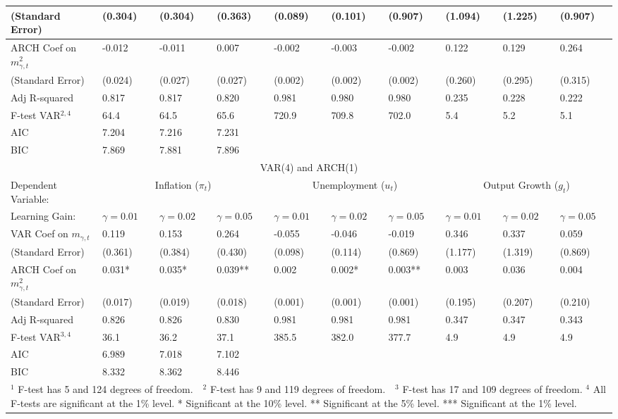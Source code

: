 \documentclass[12pt]{article}
\begin{document}
\begin{sidewaystable}
\begin{small}
\begin{center}
\begin{tabular}{l|p{0.64in} p{0.64in} p{0.64in}|p{0.64in} p{0.64in} p{0.64in}|p{0.64in} p{0.64in} p{0.64in}}
(Standard Error) & (0.304) & (0.304) & (0.363) & (0.089) & (0.101) & (0.907) & (1.094) & (1.225) & (0.907) \\ \hline
ARCH Coef on $m_{\gamma,t}^2$ & -0.012 & -0.011 & 0.007 & -0.002 & -0.003 & -0.002 & 0.122 & 0.129 & 0.264 \\
(Standard Error) & (0.024) & (0.027) & (0.027) & (0.002) & (0.002) & (0.002) & (0.260) & (0.295) & (0.315) \\ \hline
Adj R-squared & 0.817 & 0.817 & 0.820 & 0.981 & 0.980 & 0.980 & 0.235 & 0.228 & 0.222 \\ 
F-test VAR$^{2,4}$ & 64.4 & 64.5 & 65.6 & 720.9 & 709.8 & 702.0 & 5.4 & 5.2 & 5.1 \\ 
AIC & 7.204 & 7.216 & 7.231   & & &   & & & \\ 
BIC & 7.869 & 7.881 & 7.896   & & &   & & & \\ \hline \hline
\multicolumn{10}{c}{VAR(4) and ARCH(1)} \\ \hline \hline
Dependent Variable:  & \multicolumn{3}{c|}{Inflation ($\pi_t$)} & \multicolumn{3}{c|}{Unemployment ($u_t$)} &  \multicolumn{3}{c}{Output Growth ($g_t$)} \\ \hline
Learning Gain: & $\gamma=0.01$ & $\gamma=0.02$ & $\gamma=0.05$ & $\gamma=0.01$ & $\gamma=0.02$ & $\gamma=0.05$& $\gamma=0.01$ & $\gamma=0.02$ & $\gamma=0.05$ \\ \hline
VAR Coef on $m_{\gamma,t}$ & 0.119 & 0.153 & 0.264 & -0.055 & -0.046 & -0.019 & 0.346 & 0.337 & 0.059 \\
(Standard Error) & (0.361) & (0.384) & (0.430) & (0.098) & (0.114) & (0.869) & (1.177) & (1.319) & (0.869) \\ \hline
ARCH Coef on $m_{\gamma,t}^2$ & 0.031* & 0.035* & 0.039** & 0.002 & 0.002* & 0.003** & 0.003 & 0.036 & 0.004 \\
(Standard Error) & (0.017) & (0.019) & (0.018) & (0.001) & (0.001) & (0.001) & (0.195) & (0.207) & (0.210) \\ \hline
Adj R-squared & 0.826 & 0.826 & 0.830 & 0.981 & 0.981 & 0.981 & 0.347 & 0.347 & 0.343 \\ 
F-test VAR$^{3,4}$ & 36.1 & 36.2 & 37.1 & 385.5 & 382.0 & 377.7 & 4.9 & 4.9 & 4.9 \\ 
AIC & 6.989 & 7.018 & 7.102   & & &   & & & \\ 
BIC & 8.332 & 8.362 & 8.446   & & &   & & & \\ \hline \hline
\multicolumn{10}{p{8.7in}}{$^1$ F-test has 5 and 124 degrees of freedom.~~$^2$ F-test has 9 and 119 degrees of freedom.~~$^3$ F-test has 17 and 109 degrees of freedom.\newline
$^4$ All F-tests are significant at the 1\% level. \newline
* Significant at the 10\% level.  ** Significant at the 5\% level.  *** Significant at the 1\% level.}\\
\end{tabular}
\end{center}
\end{small}
\end{sidewaystable}
\end{document}
